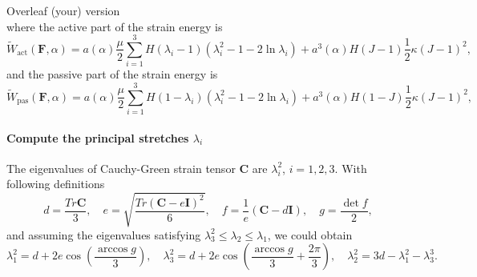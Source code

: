 \documentclass[12pt,3p]{article}
\numberwithin{equation}{section}
\begin{document}
Overleaf (your) version \\
where the active part of the strain energy is
\begin{equation}
\widetilde{W}_\text{act}\left(\mathbf{F},\alpha\right)=a(\alpha)\frac{\mu}{2}\sum_{i=1}^{3}H(\lambda_i-1)\left(\lambda_i^2-1-2\ln\lambda_i\right) + a^3(\alpha)H(J-1)\frac{1}{2}\kappa\left(J-1\right)^2,
\end{equation}
and the passive part of the strain energy is
\begin{equation}
\widetilde{W}_\text{pas}\left(\mathbf{F},\alpha\right)=a(\alpha)\frac{\mu}{2}\sum_{i=1}^{3}H(1-\lambda_i)\left(\lambda_i^2-1-2\ln\lambda_i\right) + a^3(\alpha)H(1-J)\frac{1}{2}\kappa\left(J-1\right)^2,
\end{equation}

\paragraph{Compute the principal stretches $\lambda_i$}
The eigenvalues of Cauchy-Green strain tensor $\mathbf{C}$ are $\lambda_i^2$, $i=1,2,3$.
With following definitions 
\begin{equation}
d=\frac{ Tr {\mathbf{C}}}{3},\quad e= \sqrt{\frac{ Tr { (\mathbf{C}-e\mathbf{I} )^2}}{6}},\quad
f=\frac{1}{e}\left(\mathbf{C}-d\mathbf{I}\right),\quad g=\frac{\det{f}}{2},
\end{equation}
and assuming the eigenvalues satisfying $\lambda_3^2\le\lambda_2\le\lambda_1$, we could obtain \citep{smith1961eigenvalues}
\begin{equation}
\lambda_1^2 = d +2e\cos\left(\frac{\arccos g}{3}\right), \quad \lambda_3^2 = d +2e\cos\left(\frac{\arccos g}{3}+\frac{2\pi}{3}\right), \quad \lambda_2^2 = 3d -\lambda_1^2 -\lambda_3^3.
\end{equation}


\end{document}
